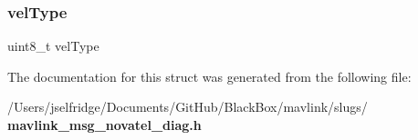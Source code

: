 \mbox{\label{struct____mavlink__novatel__diag__t_a0b838b37473e25b7405db6c801666ab0}} 
\subsubsection{vel\+Type}
{\footnotesize\ttfamily uint8\+\_\+t vel\+Type}



The documentation for this struct was generated from the following file\+:\begin{DoxyCompactItemize}
\item 
/\+Users/jselfridge/\+Documents/\+Git\+Hub/\+Black\+Box/mavlink/slugs/\textbf{ mavlink\+\_\+msg\+\_\+novatel\+\_\+diag.\+h}\end{DoxyCompactItemize}
